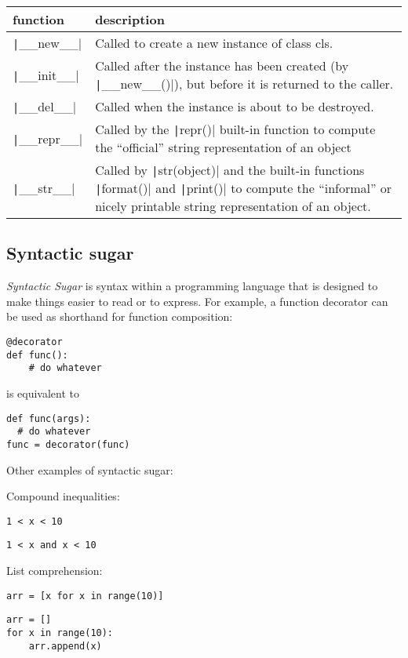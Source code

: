 \documentclass{article}
\begin{document}
\begin{table}[H]
\begin{tabular}{l p{10cm}}
  function & description\\\toprule
  \texttt|__new__| & Called to create a new instance of class cls.\\\cmidrule{2-2}
  \texttt|__init__| & Called after the instance has been created (by \texttt|__new__()|), but before it is returned to the caller.\\\cmidrule{2-2}
  \texttt|__del__| & Called when the instance is about to be destroyed.\\\cmidrule{2-2}
  \texttt|__repr__| & Called by the \texttt|repr()| built-in function to compute the ``official'' string representation of an object\\\cmidrule{2-2}
  \texttt|__str__| & Called by \texttt|str(object)| and the built-in functions \texttt|format()| and \texttt|print()| to compute the ``informal'' or nicely printable string representation of an object.
\end{tabular}
\end{table}
\subsection{Syntactic sugar}
\emph{Syntactic Sugar} is syntax within a programming language that is designed to make things
easier to read or to express. For example, a function decorator can be used as shorthand
for function composition:
\begin{verbatim}
@decorator
def func():
    # do whatever
\end{verbatim}
is equivalent to
\begin{verbatim}
def func(args):
  # do whatever
func = decorator(func)
\end{verbatim}
Other examples of syntactic sugar:

Compound inequalities:
\begin{multicols}{2}
\begin{verbatim}
1 < x < 10
\end{verbatim}
\begin{verbatim}
1 < x and x < 10
\end{verbatim}
\end{multicols}
List comprehension:
\begin{multicols}{2}
\begin{verbatim}
arr = [x for x in range(10)]
\end{verbatim}
\vfill\null
\columnbreak
\begin{verbatim}
arr = []
for x in range(10):
    arr.append(x)
\end{verbatim}
\end{multicols}
\end{document}
